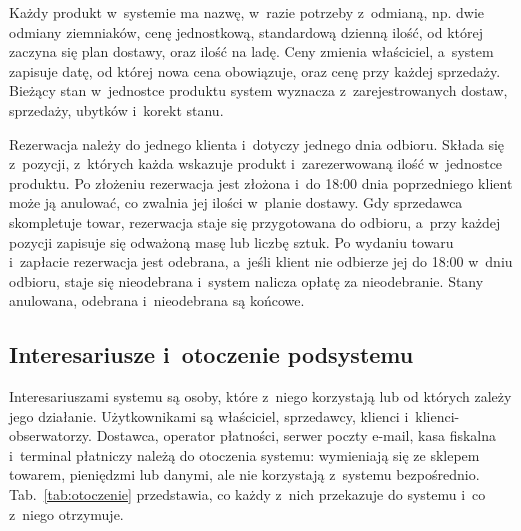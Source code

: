 \documentclass[12pt,a4paper,oneside]{article}
\begin{document}
Każdy produkt w~systemie ma nazwę, w~razie potrzeby z~odmianą, np. dwie odmiany ziemniaków, cenę jednostkową, standardową dzienną ilość, od której zaczyna się plan dostawy, oraz ilość na ladę. Ceny zmienia właściciel, a~system zapisuje datę, od której nowa cena obowiązuje, oraz cenę przy każdej sprzedaży. Bieżący stan w~jednostce produktu system wyznacza z~zarejestrowanych dostaw, sprzedaży, ubytków i~korekt stanu.

Rezerwacja należy do jednego klienta i~dotyczy jednego dnia odbioru. Składa się z~pozycji, z~których każda wskazuje produkt i~zarezerwowaną ilość w~jednostce produktu. Po złożeniu rezerwacja jest złożona i~do 18:00 dnia poprzedniego klient może ją anulować, co zwalnia jej ilości w~planie dostawy. Gdy sprzedawca skompletuje towar, rezerwacja staje się przygotowana do odbioru, a~przy każdej pozycji zapisuje się odważoną masę lub liczbę sztuk. Po wydaniu towaru i~zapłacie rezerwacja jest odebrana, a~jeśli klient nie odbierze jej do 18:00 w~dniu odbioru, staje się nieodebrana i~system nalicza opłatę za nieodebranie. Stany anulowana, odebrana i~nieodebrana są końcowe.

\subsection{Interesariusze i~otoczenie podsystemu}
\label{sec:otoczenie}

Interesariuszami systemu są osoby, które z~niego korzystają lub od których zależy jego działanie. Użytkownikami są właściciel, sprzedawcy, klienci i~klienci-obserwatorzy. Dostawca, operator płatności, serwer poczty e-mail, kasa fiskalna i~terminal płatniczy należą do otoczenia systemu: wymieniają się ze sklepem towarem, pieniędzmi lub danymi, ale nie korzystają z~systemu bezpośrednio. Tab.~\ref{tab:otoczenie} przedstawia, co każdy z~nich przekazuje do systemu i~co z~niego otrzymuje.
\end{document}
